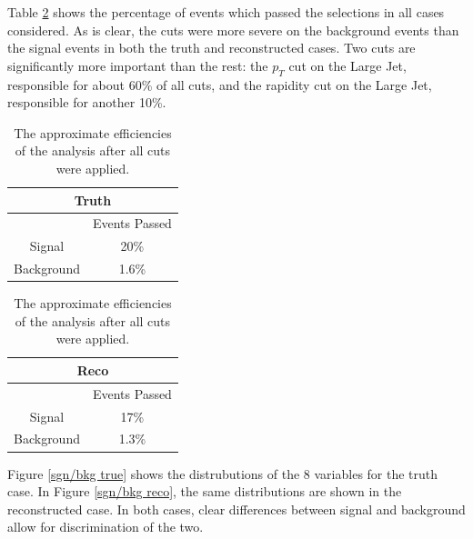 \documentclass[10pt,a4paper]{book}
\begin{document}
Table \ref{Efficiencies table} shows the percentage of events which passed the selections in all cases considered. As is clear, the cuts were more severe on the background events than the signal events in both the truth and reconstructed cases. Two cuts are significantly more important than the rest: the $p_T$ cut on the Large Jet, responsible for about 60\% of all cuts, and the rapidity cut on the Large Jet, responsible for another 10\%.

\begin{table}[!htb]
    \begin{minipage}{.5\linewidth}
      \centering
        \begin{tabular}{|c|c|}
		\hline 
		\multicolumn{2}{|c|}{\textbf{Truth}} \\ 
		\hline 
		\* & Events Passed \\ 
		\hline 
		Signal & 20\% \\ 
		\hline 
		Background & 1.6\% \\ 
		\hline 
		\end{tabular}  
    \end{minipage}%
    \begin{minipage}{.5\linewidth}
      \centering
        \begin{tabular}{|c|c|}
		\hline 
		\multicolumn{2}{|c|}{\textbf{Reco}} \\ 
		\hline 
		\* & Events Passed \\ 
		\hline 
		Signal & 17\% \\ 
		\hline 
		Background & 1.3\% \\ 
		\hline 
		\end{tabular} 
    \end{minipage} 
    \caption{The approximate efficiencies of the analysis after all cuts were applied.}
    \label{Efficiencies table}
\end{table}

Figure \ref{sgn/bkg true} shows the distrubutions of the 8 variables for the truth case. In Figure \ref{sgn/bkg reco}, the same distributions are shown in the reconstructed case. In both cases, clear differences between signal and background allow for discrimination of the two.
\end{document}
